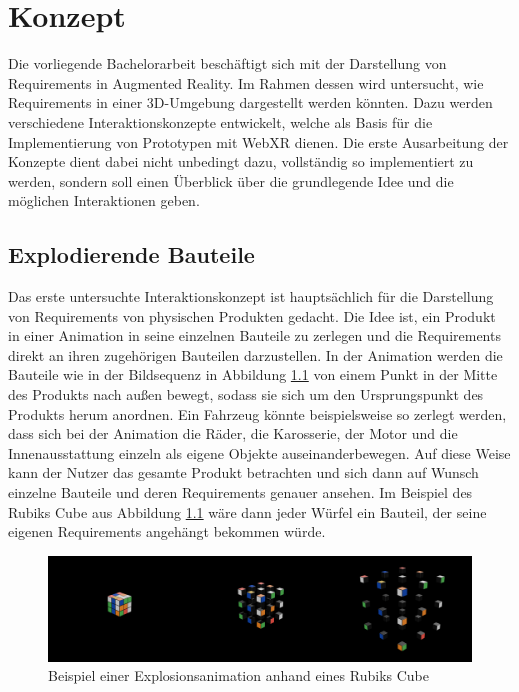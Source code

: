 \chapter{Konzept}
\label{section:konzept}

Die vorliegende Bachelorarbeit beschäftigt sich mit der Darstellung von Requirements in Augmented Reality.
Im Rahmen dessen wird untersucht, wie Requirements in einer 3D-Umgebung dargestellt werden könnten.
Dazu werden verschiedene Interaktionskonzepte entwickelt, welche als Basis für die Implementierung von Prototypen mit WebXR dienen.
Die erste Ausarbeitung der Konzepte dient dabei nicht unbedingt dazu, vollständig so implementiert zu werden, sondern soll einen Überblick über die grundlegende Idee und die möglichen Interaktionen geben.


\section{Explodierende Bauteile}

Das erste untersuchte Interaktionskonzept ist hauptsächlich für die Darstellung von Requirements von physischen Produkten gedacht.
Die Idee ist, ein Produkt in einer Animation in seine einzelnen Bauteile zu zerlegen und die Requirements direkt an ihren zugehörigen Bauteilen darzustellen.
In der Animation werden die Bauteile wie in der Bildsequenz in Abbildung \ref{fig:rubiks-explosion} von einem Punkt in der Mitte des Produkts nach außen bewegt, sodass sie sich um den Ursprungspunkt des Produkts herum anordnen.
Ein Fahrzeug könnte beispielsweise so zerlegt werden, dass sich bei der Animation die Räder, die Karosserie, der Motor und die Innenausstattung einzeln als eigene Objekte auseinanderbewegen.
Auf diese Weise kann der Nutzer das gesamte Produkt betrachten und sich dann auf Wunsch einzelne Bauteile und deren Requirements genauer ansehen. 
Im Beispiel des Rubiks Cube aus Abbildung \ref{fig:rubiks-explosion} wäre dann jeder Würfel ein Bauteil, der seine eigenen Requirements angehängt bekommen würde.



\begin{figure}[H]
    \centering
    \includegraphics[width=1\textwidth]{images/RubiksExplosion.png}
    \caption{Beispiel einer Explosionsanimation anhand eines Rubiks Cube}
    \label{fig:rubiks-explosion}
\end{figure}

